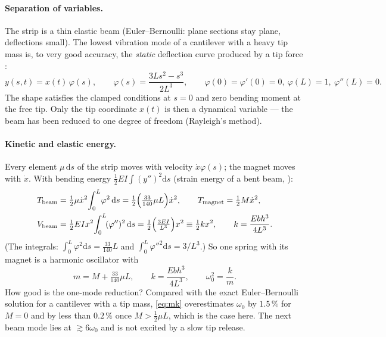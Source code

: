 \documentclass[11pt,a4paper]{article}
\newcommand{\dd}{\mathrm{d}}
\begin{document}
\paragraph{Separation of variables.} The strip is a thin elastic beam (Euler--Bernoulli: plane sections stay plane, deflections small). The lowest vibration mode of a cantilever with a heavy tip mass is, to very good accuracy, the \emph{static} deflection curve produced by a tip force \cite{gere,rao}:
\begin{equation}
y(s,t)=x(t)\,\varphi(s),\qquad \varphi(s)=\frac{3Ls^2-s^3}{2L^3},\qquad \varphi(0)=\varphi'(0)=0,\ \varphi(L)=1,\ \varphi''(L)=0.
\label{eq:shape}
\end{equation}
The shape satisfies the clamped conditions at $s=0$ and zero bending moment at the free tip. Only the tip coordinate $x(t)$ is then a dynamical variable --- the beam has been reduced to one degree of freedom (Rayleigh's method).

\paragraph{Kinetic and elastic energy.} Every element $\mu\,\dd s$ of the strip moves with velocity $\dot x\varphi(s)$; the magnet moves with $\dot x$. With bending energy $\tfrac12 EI\int (y'')^2\dd s$ (strain energy of a bent beam, \cite{gere}):
\begin{align}
T_{\rm beam}&=\tfrac12\mu\dot x^2\!\int_0^L\!\varphi^2\,\dd s=\tfrac12\Bigl(\tfrac{33}{140}\mu L\Bigr)\dot x^2,\qquad
T_{\rm magnet}=\tfrac12 M\dot x^2,\label{eq:T}\\
V_{\rm beam}&=\tfrac12 EI x^2\!\int_0^L\!(\varphi'')^2\,\dd s=\tfrac12\Bigl(\tfrac{3EI}{L^3}\Bigr)x^2\equiv\tfrac12 kx^2,\qquad k=\frac{Ebh^3}{4L^3}.\label{eq:V}
\end{align}
(The integrals: $\int_0^L\varphi^2\dd s=\tfrac{33}{140}L$ and $\int_0^L\varphi''^2\dd s=3/L^3$.) So one spring with its magnet is a harmonic oscillator with
\begin{equation}
m=M+\tfrac{33}{140}\mu L,\qquad k=\frac{Ebh^3}{4L^3},\qquad \omega_0^2=\frac km .
\label{eq:mk}
\end{equation}
How good is the one-mode reduction? Compared with the exact Euler--Bernoulli solution for a cantilever with a tip mass, \eqref{eq:mk} overestimates $\omega_0$ by $1.5\,\%$ for $M=0$ and by less than $0.2\,\%$ once $M>\tfrac12\mu L$, which is the case here. The next beam mode lies at $\gtrsim6\omega_0$ and is not excited by a slow tip release.
\end{document}
